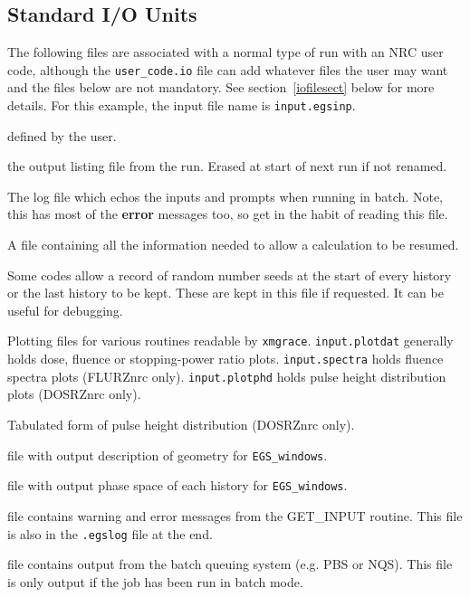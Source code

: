 \documentclass[12pt,twoside]{article}  %
\begin{document}
\subsection{Standard I/O Units}
\label{iounits}
The following files are associated with a normal type of run with an NRC
user code, although the {\tt user\_code.io} file can add whatever files
the user
may want and the files below are not mandatory.  See section~\ref{iofilesect}
below for more details.  For
this example, the input file name is \verb+input.egsinp+.
\begin{description}

\item [input.egsinp:] defined by the user.

\item [input.egslst:]  the output listing file from the run. Erased
at start of next run if not renamed.

\item [input.egslog:] The log file which echos the inputs and
prompts when running in batch. Note, this has most of the {\bf error}
messages too, so get in the habit of reading this file.

\item [input.egsdat:] A file containing all the information needed to
allow a calculation to be resumed.

\item [input.egsrns:] Some codes allow a record of random number seeds
at the start of every history or the last history to be kept. These are
kept in this file if requested. It can be useful for debugging.

\item [input.plotdat, input.spectra, input.plotphd:] Plotting files for
various routines readable by \verb+xmgrace+.  {\tt input.plotdat} generally
holds dose, fluence or stopping-power ratio plots. {\tt input.spectra}
holds fluence spectra plots (FLURZnrc only).  {\tt input.plotphd} holds
pulse height distribution plots (DOSRZnrc only).

\item [input.egseff:] Tabulated form of pulse height distribution
(DOSRZnrc only).

\item [input.egsgeom:] file with output description of geometry for
\verb+EGS_windows+.

\item [input.egsgph:] file with output phase space of each history for
\verb+EGS_windows+.

\item[input.errors:] file contains warning and error messages from the
GET\_INPUT routine. This file is also in the {\tt .egslog} file at the end.

\item[input.eo:] file contains output from the batch queuing system
(e.g. PBS or NQS).  This file is only output if the job has been run
in batch mode.
\end{description}
\end{document}
